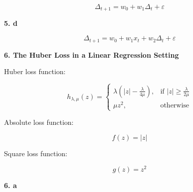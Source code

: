 \documentclass{article}
\begin{document}
\[
\Delta_{t+1}=w_0+w_1\Delta_{t}+\varepsilon
\]

\textbf{5. d}

\[
\Delta_{t+1}=w_0+w_1x_t+w_2\Delta_{t}+\varepsilon
\]

\vspace{4mm}

\textbf{6. The Huber Loss in a Linear Regression Setting}

Huber loss function:

\[
h_{\lambda,\mu}(z)=
\begin{cases}
\lambda\left(|z|-\frac{\lambda}{4\mu} \right), & \textrm{if $|z|\geq\frac{\lambda}{2\mu}$} \\
\mu z^2, & \textrm{otherwise}
\end{cases}
\]

Absolute loss function:

\[
f(z)=|z|
\]

Square loss function:

\[
g(z)=z^2
\]

\textbf{6. a}
\end{document}
